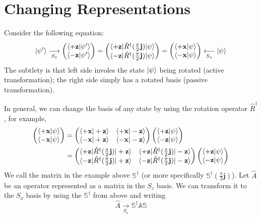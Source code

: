 \documentclass{report}
\begin{document}
\section{Changing Representations}
Consider the following equation:
\[
	\ket{\psi '} \underset{S_z}\longrightarrow \begin{pmatrix} \braket{+ \mathbf z | \psi '} \\ \braket{- \mathbf z | \psi '} \end{pmatrix} = \begin{pmatrix} \braket{+ \mathbf z | \hat R^ \dag ( \frac{\pi}{2} \mathbf j ) | \psi } \\ \braket{- \mathbf z | \hat R^ \dag ( \frac{\pi}{2} \mathbf j ) |\psi } \end{pmatrix} = \begin{pmatrix} \braket{+ \mathbf x | \psi} \\ \braket{- \mathbf x | \psi} \end{pmatrix} \underset{S_x}\longleftarrow \ket{\psi} 
\] 
The subtlety is that left side involes the state \(\ket{\psi}\) being rotated (active transformation); the right side simply has a rotated basis (passive transformation). 

In general, we can change the basis of any state by using the rotation operator \(\hat R ^\dag\), for example, 
\begin{align*}
	\begin{pmatrix} \braket{+ \mathbf x | \psi} \\ \braket{- \mathbf x | \psi} \end{pmatrix} &= \begin{pmatrix} \braket{+ \mathbf x | + \mathbf z} & \braket{+ \mathbf x | - \mathbf z}\\ \braket{- \mathbf x | + \mathbf z} & \braket{- \mathbf x | - \mathbf z} \end{pmatrix} \begin{pmatrix} \braket{+ \mathbf z | \psi} \\ \braket{- \mathbf z |\psi} \end{pmatrix} \\
												 &=\begin{pmatrix} \braket{+ \mathbf z | \hat R^\dag ( \frac{\pi}{2} \mathbf j )| + \mathbf z} & \braket{+ \mathbf z | \hat R^\dag ( \frac{\pi}{2} \mathbf j )| - \mathbf z} \\ \braket{- \mathbf z | \hat R^\dag ( \frac{\pi}{2} \mathbf j )| + \mathbf z}  & \braket{- \mathbf z | \hat R^\dag ( \frac{\pi}{2} \mathbf j )| - \mathbf z}  \end{pmatrix} \begin{pmatrix} \braket{+ \mathbf z | \psi} \\ \braket{- \mathbf z | \psi} \end{pmatrix} 
\end{align*}
We call the matrix in the example above \(\mathbb S^\dag\) (or more specifically \(\mathbb S^\dag (\frac{\pi}{2} \mathbf j)\)). Let \(\hat A\) be an operator represented as a matrix in the \(S_z\) basis. We can transform it to the \(S_x \) basis by using the \(\mathbb S^\dag\) from above and writing
\[
\hat A \underset{S_x} \longrightarrow \mathbb S^\dag \mathbb A \mathbb S
\] 
\end{document}
